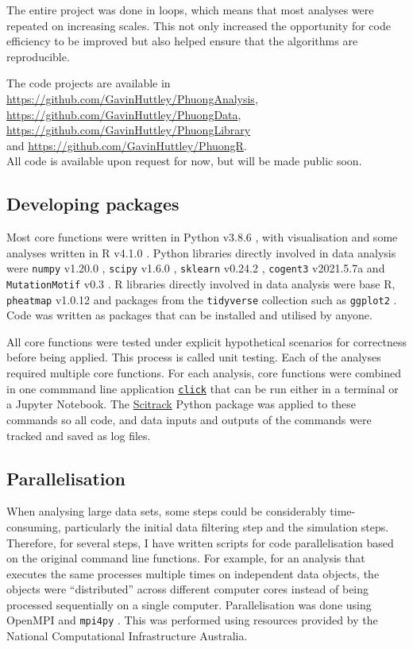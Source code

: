 The entire project was done in loops, which means that most analyses were repeated on increasing scales. This not only increased the opportunity for code efficiency to be improved but also helped ensure that the algorithms are reproducible. 

The code projects are available in \\ \url{https://github.com/GavinHuttley/PhuongAnalysis}, \url{https://github.com/GavinHuttley/PhuongData}, \url{https://github.com/GavinHuttley/PhuongLibrary} \\ and \url{https://github.com/GavinHuttley/PhuongR}. \\ All code is available upon request for now, but will be made public soon. 

\subsection{Developing packages}
Most core functions were written in Python v3.8.6 \citep{van1995python}, with visualisation and some analyses written in R v4.1.0 \citep{r}. Python libraries directly involved in data analysis were \texttt{numpy} v1.20.0 \citep{harris2020array}, \texttt{scipy} v1.6.0 \citep{2020SciPy-NMeth}, \texttt{sklearn} v0.24.2 \citep{scikit-learn}, \texttt{cogent3} v2021.5.7a \citep{pycogent3} and \texttt{MutationMotif} v0.3 \citep{Zhu2017}. R libraries directly involved in data analysis were base R, \texttt{pheatmap} v1.0.12 \citep{pheatmap} and packages from the \texttt{tidyverse} collection such as \texttt{ggplot2} \citep{tidyverse}. Code was written as packages that can be installed and utilised by anyone.

All core functions were tested under explicit hypothetical scenarios for correctness before being applied. This process is called unit testing. Each of the analyses required multiple core functions. For each analysis, core functions were combined in one commmand line application \texttt{\href{https://click.palletsprojects.com/en/8.0.x/}{click}} that can be run either in a terminal or a Jupyter Notebook. The \href{https://github.com/HuttleyLab/scitrack}{Scitrack} Python package was applied to these commands so all code, and  data inputs and outputs of the commands were tracked and saved as log files.

\subsection{Parallelisation}
When analysing large data sets, some steps could be considerably time-consuming, particularly the initial data filtering step and the simulation steps. Therefore, for several steps, I have written scripts for code parallelisation based on the original command line functions. For example, for an analysis that executes the same processes multiple times on independent data objects, the objects were ``distributed'' across different computer cores instead of being processed sequentially on a single computer. Parallelisation was done using OpenMPI \citep{gabriel04:_open_mpi} and \texttt{mpi4py} \citep{Dalcin2011ParallelPython}. This was performed using resources provided by the National Computational Infrastructure Australia.


